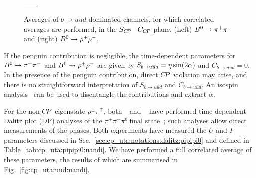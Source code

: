 \begin{figure}[htb]
\begin{center}
\begin{tabular}{cc}
{      }
    \end{tabular}
  \end{center}
  \vspace{-0.8cm}
  \caption{
    Averages of $b \to u\bar u d$ dominated channels,
    for which correlated averages are performed,
    in the $S_{C\!P}$ \vs\ $C_{C\!P}$ plane.
    (Left) $B^0 \to \pi^+\pi^-$ and (right) $B^0 \to \rho^+\rho^-$.
  }
  \label{fig:cp_uta:uud_SvsC}
\end{figure}


If the penguin contribution is negligible, 
the time-dependent parameters for $B^0 \to \pi^+\pi^-$ 
and $B^0 \to \rho^+\rho^-$ are given by
$S_{b \to u\bar u d} = \etacp \sin(2\alpha)$ and
$C_{b \to u\bar u d} = 0$.
In the presence of the penguin contribution, 
direct $C\!P$ violation may arise, 
and there is no straightforward interpretation 
of $S_{b \to u\bar u d}$ and $C_{b \to u\bar u d}$.
An isospin analysis~\cite{Gronau:1990ka} 
can be used to disentangle the contributions and extract $\alpha$.

For the non-$C\!P$ eigenstate $\rho^{\pm}\pi^{\mp}$, 
both \babar~\cite{Aubert:2007jn} 
and \belle~\cite{Kusaka:2007dv,:2007mj} have performed 
time-dependent Dalitz plot (DP) analyses
of the $\pi^+\pi^-\pi^0$ final state~\cite{Snyder:1993mx};
such analyses allow direct measurements of the phases.
Both experiments have measured the $U$ and $I$ parameters discussed in 
Sec.~\ref{sec:cp_uta:notations:dalitz:pipipi0} and defined in 
Table~\ref{tab:cp_uta:pipipi0:uandi}.
We have performed a full correlated average of these parameters,
the results of which are summarised in Fig.~\ref{fig:cp_uta:uud:uandi}.

